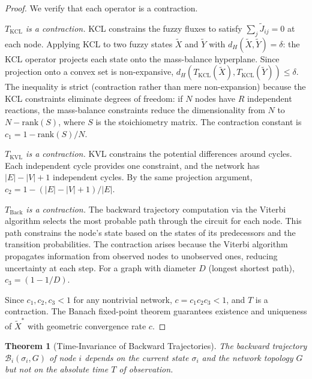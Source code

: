 \documentclass[twocolumn,10pt,a4paper]{article}
\newtheorem{theorem}{Theorem}[section]
\theoremstyle{definition}
\theoremstyle{remark}
\newcommand{\Back}{\mathcal{B}}
\begin{document}
\begin{proof}
We verify that each operator is a contraction.

\emph{$T_{\mathrm{KCL}}$ is a contraction.} KCL constrains the fuzzy fluxes to satisfy $\sum_j \tilde{J}_{ij} = 0$ at each node. Applying KCL to two fuzzy states $\tilde{X}$ and $\tilde{Y}$ with $d_H(\tilde{X}, \tilde{Y}) = \delta$: the KCL operator projects each state onto the mass-balance hyperplane. Since projection onto a convex set is non-expansive, $d_H(T_{\mathrm{KCL}}(\tilde{X}), T_{\mathrm{KCL}}(\tilde{Y})) \leq \delta$. The inequality is strict (contraction rather than mere non-expansion) because the KCL constraints eliminate degrees of freedom: if $N$ nodes have $R$ independent reactions, the mass-balance constraints reduce the dimensionality from $N$ to $N - \mathrm{rank}(S)$, where $S$ is the stoichiometry matrix. The contraction constant is $c_1 = 1 - \mathrm{rank}(S)/N$.

\emph{$T_{\mathrm{KVL}}$ is a contraction.} KVL constrains the potential differences around cycles. Each independent cycle provides one constraint, and the network has $|E| - |V| + 1$ independent cycles. By the same projection argument, $c_2 = 1 - (|E| - |V| + 1)/|E|$.

\emph{$T_{\mathrm{Back}}$ is a contraction.} The backward trajectory computation via the Viterbi algorithm selects the most probable path through the circuit for each node. This path constrains the node's state based on the states of its predecessors and the transition probabilities. The contraction arises because the Viterbi algorithm propagates information from observed nodes to unobserved ones, reducing uncertainty at each step. For a graph with diameter $D$ (longest shortest path), $c_3 = (1 - 1/D)$.

Since $c_1, c_2, c_3 < 1$ for any nontrivial network, $c = c_1 c_2 c_3 < 1$, and $T$ is a contraction. The Banach fixed-point theorem guarantees existence and uniqueness of $\tilde{X}^*$ with geometric convergence rate $c$.
\end{proof}

\begin{theorem}[Time-Invariance of Backward Trajectories]
\label{thm:time_invariance}
The backward trajectory $\Back_i(\sigma_i, G)$ of node $i$ depends on the current state $\sigma_i$ and the network topology $G$ but not on the absolute time $T$ of observation.
\end{theorem}
\end{document}
